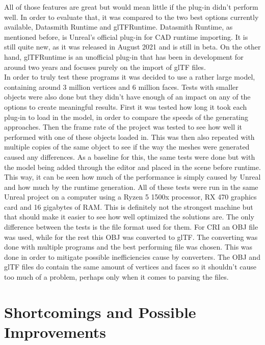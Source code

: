 All of those features are great but would mean little if the plug-in didn't perform well. In order to evaluate that, it was compared to the two best options currently available, Datasmith Runtime and glTFRuntime. Datasmith Runtime, as mentioned before, is Unreal's official plug-in for CAD runtime importing. It is still quite new, as it was released in August 2021 and is still in beta. On the other hand, glTFRuntime is an unofficial plug-in that has been in development for around two years and focuses purely on the import of glTF files.\\
In order to truly test these programs it was decided to use a rather large model, containing around 3 million vertices and 6 million faces. Tests with smaller objects were also done but they didn't have enough of an impact on any of the options to create meaningful results. First it was tested how long it took each plug-in to load in the model, in order to compare the speeds of the generating approaches. Then the frame rate of the project was tested to see how well it performed with one of these objects loaded in. This was then also repeated with multiple copies of the same object to see if the way the meshes were generated caused any differences. As a baseline for this, the same tests were done but with the model being added through the editor and placed in the scene before runtime. This way, it can be seen how much of the performance is simply caused by Unreal and how much by the runtime generation. All of these tests were run in the same Unreal project on a computer using a Ryzen 5 1500x processor, RX 470 graphics card and 16 gigabytes of RAM. This is definitely not the strongest machine but that should make it easier to see how well optimized the solutions are. The only difference between the tests is the file format used for them. For CRI an OBJ file was used, while for the rest this OBJ was converted to glTF. The converting was done with multiple programs and the best performing file was chosen. This was done in order to mitigate possible inefficiencies cause by converters. The OBJ and glTF files do contain the same amount of vertices and faces so it shouldn't cause too much of a problem, perhaps only when it comes to parsing the files.



\section{Shortcomings and Possible Improvements}




